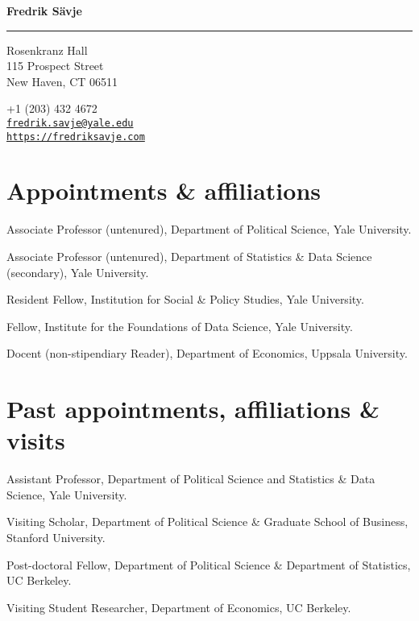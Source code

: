 \documentclass[10pt,letterpaper]{article}
\newenvironment{datelist}{
	\begin{list}{}{
		\setlength{\parskip}{0pt}
		\setlength{\itemsep}{4pt}
		\setlength{\parsep}{0.3em}
		\setlength{\leftmargin}{5.85em}
		\setlength{\labelwidth}{5.85em}
		\setlength{\labelsep}{1.5em}
		}
	}{
\end{list}
}
\newcommand{\dateitem}[2][]{\item[{#1}] {#2}}
\newenvironment{infolist}{
	\begin{list}{}{
		\setlength{\parskip}{0pt}
		\setlength{\itemsep}{4pt}
		\setlength{\parsep}{0.3em}
		\setlength{\leftmargin}{0em}
		\setlength{\labelwidth}{0em}
		}
	}{
\end{list}
}
\newcommand{\infoitem}[1]{\item {#1}}
\begin{document}
	{\huge \bf Fredrik Sävje}

	\rule{\textwidth}{1pt}

	\bigskip


	\begin{minipage}[t]{0.495\textwidth}
		Rosenkranz Hall \\
		115 Prospect Street \\
		New Haven, CT 06511
	\end{minipage}
	\begin{minipage}[t]{0.495\textwidth}
		+1 (203) 432 4672 \\
		\href{mailto:fredrik.savje@yale.edu}{\texttt{fredrik.savje@yale.edu}} \\
		\href{https://fredriksavje.com}{\texttt{https://fredriksavje.com}}
	\end{minipage}

	\vspace{0.3in}


	\section*{Appointments \& affiliations}

	\begin{infolist}
		\infoitem{Associate Professor (untenured), Department of Political Science, Yale University.}
		\infoitem{Associate Professor (untenured), Department of Statistics \& Data Science (secondary), Yale University.}
		\infoitem{Resident Fellow, Institution for Social \& Policy Studies, Yale University.}
		\infoitem{Fellow, Institute for the Foundations of Data Science, Yale University.}
		\infoitem{Docent (non-stipendiary Reader), Department of Economics, Uppsala University.}
	\end{infolist}


	\section*{Past appointments, affiliations \& visits}

	\begin{datelist}
		\dateitem[2017--2023]{Assistant Professor, Department of Political Science and Statistics \& Data Science, Yale University.}
		\dateitem[2019--2020]{Visiting Scholar, Department of Political Science \& Graduate School of Business, Stanford University.}
		\dateitem[2015--2017]{Post-doctoral Fellow, Department of Political Science \& Department of Statistics, UC Berkeley.}
		\dateitem[2013--2014]{Visiting Student Researcher, Department of Economics, UC Berkeley.}
	\end{datelist}
\end{document}
